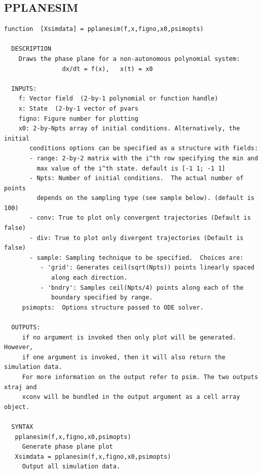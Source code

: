 \documentclass{article}
\begin{document}
\newpage
\subsection{PPLANESIM}
\begin{verbatim}
function  [Xsimdata] = pplanesim(f,x,figno,x0,psimopts)

  DESCRIPTION
    Draws the phase plane for a non-autonomous polynomial system:
                dx/dt = f(x),   x(t) = x0

  INPUTS:
    f: Vector field  (2-by-1 polynomial or function handle)
    x: State  (2-by-1 vector of pvars
    figno: Figure number for plotting
    x0: 2-by-Npts array of initial conditions. Alternatively, the initial
       conditions options can be specified as a structure with fields:
       - range: 2-by-2 matrix with the i^th row specifying the min and
         max value of the i^th state. default is [-1 1; -1 1]
       - Npts: Number of initial conditions.  The actual number of points
         depends on the sampling type (see sample below). (default is 100)
       - conv: True to plot only convergent trajectories (Default is false)
       - div: True to plot only divergent trajectories (Default is false)
       - sample: Sampling technique to be specified.  Choices are:
          - 'grid': Generates ceil(sqrt(Npts)) points linearly spaced
             along each direction.
          - 'bndry': Samples ceil(Npts/4) points along each of the
             boundary specified by range.
     psimopts:  Options structure passed to ODE solver.

  OUTPUTS:
     if no argument is invoked then only plot will be generated. However,
     if one argument is invoked, then it will also return the simulation data.
     For more information on the output refer to psim. The two outputs xtraj and
     xconv will be bundled in the output argument as a cell array object.

  SYNTAX
   pplanesim(f,x,figno,x0,psimopts)
     Generate phase plane plot
   Xsimdata = pplanesim(f,x,figno,x0,psimopts)
     Output all simulation data.

\end{verbatim}


\newpage
\end{document}
